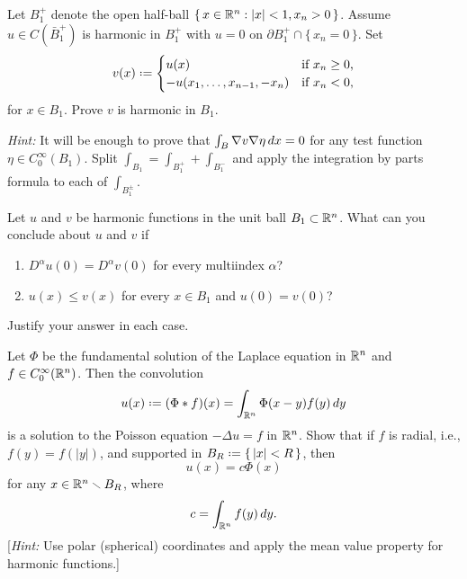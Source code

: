 \begin{problem}
  Let \(B_1^+\) denote the open half-ball
  \(\{\,x\in\mathbb{R}^n:|x|<1,x_n>0\,\}\). Assume \(u\in C(\bar B_1^+)\) is
  harmonic in \(B_1^+\) with \(u=0\) on \(\partial
  B_1^+\cap\{\,x_n=0\,\}\). Set
  \[
    v(x)\defeq
    \begin{cases}
      u(x)&\text{if \(x_n\geq 0\),}\\
      -u(x_1,\dotsc,x_{n-1},-x_n)&\text{if \(x_n<0\),}
    \end{cases}
  \]
  for \(x\in B_1\). Prove \(v\) is harmonic in \(B_1\).

  \noindent \emph{Hint:} It will be enough to prove that \(\int_B\nabla
  v\nabla\eta\mathop{}\!d x=0\) for any test function \(\eta\in
  C^\infty_0(B_1)\). Split \(\int_{B_1}=\int_{B_1^+}+\int_{B_1^-}\) and
  apply the integration by parts formula to each of \(\int_{B_1^\pm}\).
\end{problem}
\begin{solution*}
\end{solution*}

\begin{problem}
  Let \(u\) and \(v\) be harmonic functions in the unit ball
  \(B_1\subset\mathbb{R}^n\). What can you conclude about \(u\) and \(v\) if
  \begin{enumerate}[label=(\alph*),noitemsep]
  \item \(D^\alpha u(0)=D^\alpha v(0)\) for every multiindex \(\alpha\)?
  \item \(u(x)\leq v(x)\) for every \(x\in B_1\) and \(u(0)=v(0)\)?
  \end{enumerate}
  Justify your answer in each case.
\end{problem}
\begin{solution*}
\end{solution*}

\begin{problem}
  Let \(\Phi\) be the fundamental solution of the Laplace equation in
  \(\mathbb{R}^n\) and \(f\in C_0^\infty(\mathbb{R}^n)\). Then the convolution
  \[
    u(x)\defeq(\Phi* f)(x)=\int_{\bbR^n}\Phi(x-y)f(y)\diff y
  \]
  is a solution to the Poisson equation \(-\Delta u=f\) in \(\mathbb{R}^n\). Show
  that if \(f\) is radial, i.e., \(f(y)=f(|y|)\), and supported in
  \(B_R\defeq\{\,|x|<R\,\}\), then
  \[
    u(x)=c\Phi(x)
  \]
  for any \(x\in\mathbb{R}^n\smallsetminus B_R\), where
  \[
    c=\int_{\mathbb{R}^n}f(y)\mathop{}\!d y.
  \]
  [\emph{Hint:} Use polar (spherical) coordinates and apply the mean value
  property for harmonic functions.]
\end{problem}
\begin{solution*}
\end{solution*}


